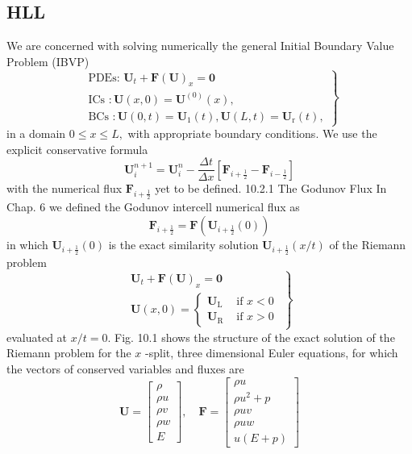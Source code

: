 \subsection{HLL}

We are concerned with solving numerically the general Initial Boundary Value Problem (IBVP)
$$
\left.\begin{array}{l}
\text { PDEs: } \mathbf{U}_{t}+\mathbf{F}(\mathbf{U})_{x}=\mathbf{0} \\
\text { ICs }: \mathbf{U}(x, 0)=\mathbf{U}^{(0)}(x), \\
\text { BCs }: \mathbf{U}(0, t)=\mathbf{U}_{1}(t), \mathbf{U}(L, t)=\mathbf{U}_{\mathrm{r}}(t),
\end{array}\right\}
$$
in a domain $0 \leq x \leq L,$ with appropriate boundary conditions. We use the explicit conservative formula
$$
\mathbf{U}_{i}^{n+1}=\mathbf{U}_{i}^{n}-\frac{\Delta t}{\Delta x}\left[\mathbf{F}_{i+\frac{1}{2}}-\mathbf{F}_{i-\frac{1}{2}}\right]
$$
with the numerical flux $\mathbf{F}_{i+\frac{1}{2}}$ yet to be defined.
10.2.1 The Godunov Flux
In Chap. 6 we defined the Godunov intercell numerical flux as
$$
\mathbf{F}_{i+\frac{1}{2}}=\mathbf{F}\left(\mathbf{U}_{i+\frac{1}{2}}(0)\right)
$$
in which $\mathbf{U}_{i+\frac{1}{2}}(0)$ is the exact similarity solution $\mathbf{U}_{i+\frac{1}{2}}(x / t)$ of the Riemann problem
$$
\left.\begin{array}{l}
\mathbf{U}_{t}+\mathbf{F}(\mathbf{U})_{x}=\mathbf{0} \\
\mathbf{U}(x, 0)=\left\{\begin{array}{ll}
\mathbf{U}_{\mathrm{L}} & \text { if } x<0 \\
\mathbf{U}_{\mathrm{R}} & \text { if } x>0
\end{array}\right.
\end{array}\right\}
$$
evaluated at $x / t=0 .$ Fig. 10.1 shows the structure of the exact solution of the Riemann problem for the $x$ -split, three dimensional Euler equations, for which the vectors of conserved variables and fluxes are
$$
\mathbf{U}=\left[\begin{array}{c}
\rho \\
\rho u \\
\rho v \\
\rho w \\
E
\end{array}\right], \quad \mathbf{F}=\left[\begin{array}{c}
\rho u \\
\rho u^{2}+p \\
\rho u v \\
\rho u w \\
u(E+p)
\end{array}\right]
$$

